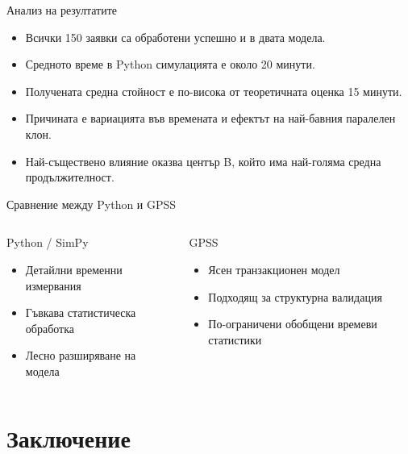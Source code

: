 \documentclass[aspectratio=169]{beamer}
\begin{document}
\begin{frame}{Анализ на резултатите}
    \begin{itemize}
        \item Всички 150 заявки са обработени успешно и в двата модела.
        \item Средното време в Python симулацията е около 20 минути.
        \item Получената средна стойност е по-висока от теоретичната оценка 15 минути.
        \item Причината е вариацията във времената и ефектът на най-бавния паралелен клон.
        \item Най-съществено влияние оказва център B, който има най-голяма средна продължителност.
    \end{itemize}
\end{frame}

\begin{frame}{Сравнение между Python и GPSS}
    \begin{columns}[T]
        \begin{block}{Python / SimPy}
            \begin{itemize}
                \item Детайлни временни измервания
                \item Гъвкава статистическа обработка
                \item Лесно разширяване на модела
            \end{itemize}
        \end{block}

        \begin{block}{GPSS}
            \begin{itemize}
                \item Ясен транзакционен модел
                \item Подходящ за структурна валидация
                \item По-ограничени обобщени времеви статистики
            \end{itemize}
        \end{block}
    \end{columns}
\end{frame}

\section{Заключение}
\end{document}
